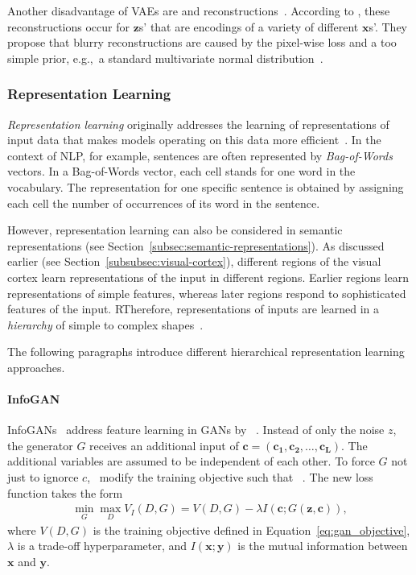 Another disadvantage of \acp{VAE} are  and  reconstructions~\citep{zhao2017towards}.
According to \citet{zhao2017towards}, these reconstructions occur for $\bm{z}$s' that are encodings of a variety of different $\bm{x}$s'.
They propose that blurry reconstructions are caused by the pixel-wise loss and a too simple prior, e.g.,~a standard multivariate normal distribution~\citep{zhao2017towards}.

\subsubsection{Representation Learning}\label{subsubsec:representation_learning}
\textit{Representation learning} originally addresses the learning of representations of input data that makes models operating on this data more efficient~\citep{bengio2013representation}.
In the context of \ac{NLP}, for example, sentences are often represented by \textit{Bag-of-Words} vectors.
In a Bag-of-Words vector, each cell stands for one word in the vocabulary.
The representation for one specific sentence is obtained by assigning each cell the number of occurrences of its word in the sentence.

However, representation learning can also be considered in semantic representations (see Section~\ref{subsec:semantic-representations}).
As discussed earlier (see Section~\ref{subsubsec:visual-cortex}), different regions of the visual cortex learn representations of the input in different regions.
Earlier regions learn representations of simple features, whereas later regions respond to sophisticated features of the input.
RTherefore, representations of inputs are learned in a \textit{hierarchy} of simple to complex shapes~\citep{rodriguez2015hierarchical}.

The following paragraphs introduce different hierarchical representation learning approaches.

\paragraph{InfoGAN}
InfoGANs~\cite{chen2016infogan} address feature learning in \acp{GAN} by ~\citep{chen2016infogan}.
Instead of only the noise $z$, the generator $G$ receives an additional input of  $\bm{c} = (\bm{c_1}, \bm{c_2}, \dots, \bm{c_L})$.
The additional variables are assumed to be independent of each other.
To force $G$ not just to ignorce $c$,~\citet{chen2016infogan} modify the training objective such that ~\citep{chen2016infogan}.
The new loss function takes the form
\begin{align}
    \min _{G} \max _{D} V_I(D, G)=V(D, G) - \lambda I(\bm{c}; G(\bm{z}, \bm{c})),
\end{align}
where $V(D, G)$ is the training objective defined in Equation~\ref{eq:gan_objective}, $\lambda$ is a trade-off hyperparameter, and $I(\bm{x}; \bm{y})$ is the mutual information between $\bm{x}$ and $\bm{y}$.

